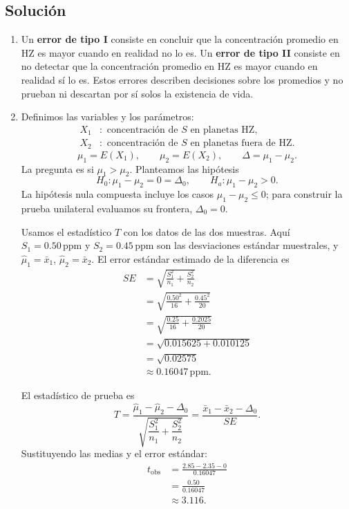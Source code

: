 \documentclass[12pt]{article}
\begin{document}
\subsection*{Solución}
\begin{enumerate}[label=(\alph*)]
    \item Un \textbf{error de tipo I} consiste en concluir que la concentración promedio en HZ es mayor cuando en realidad no lo es. Un \textbf{error de tipo II} consiste en no detectar que la concentración promedio en HZ es mayor cuando en realidad sí lo es. Estos errores describen decisiones sobre los promedios y no prueban ni descartan por sí solos la existencia de vida.

    \item Definimos las variables y los parámetros:
    \[
    \begin{aligned}
    X_1&:\text{ concentración de }S\text{ en planetas HZ},\\
    X_2&:\text{ concentración de }S\text{ en planetas fuera de HZ}.
    \end{aligned}
    \]
    $$
    \mu_1=E(X_1),\qquad \mu_2=E(X_2),\qquad
    \Delta=\mu_1-\mu_2.
    $$
    La pregunta es si $\mu_1>\mu_2$. Planteamos las hipótesis
    $$
    H_0:\mu_1-\mu_2=0=\Delta_0,
    \qquad
    H_a:\mu_1-\mu_2>0.
    $$
    La hipótesis nula compuesta incluye los casos $\mu_1-\mu_2\leq0$; para construir la prueba unilateral evaluamos su frontera, $\Delta_0=0$.

    Usamos el estadístico $T$ con los datos de las dos muestras. Aquí $S_1=0.50\,\mathrm{ppm}$ y $S_2=0.45\,\mathrm{ppm}$ son las desviaciones estándar muestrales, y $\hat{\mu}_1=\bar{x}_1$, $\hat{\mu}_2=\bar{x}_2$. El error estándar estimado de la diferencia es
    \begin{align*}
    SE
    &=\sqrt{\frac{S_1^2}{n_1}+\frac{S_2^2}{n_2}}\\
    &=\sqrt{\frac{0.50^2}{16}+\frac{0.45^2}{20}}\\
    &=\sqrt{\frac{0.25}{16}+\frac{0.2025}{20}}\\
    &=\sqrt{0.015625+0.010125}\\
    &=\sqrt{0.02575}\\
    &\approx0.16047\,\mathrm{ppm}.
    \end{align*}

    El estadístico de prueba es
    $$
    T=\frac{\hat{\mu}_1-\hat{\mu}_2-\Delta_0}
    {\sqrt{\dfrac{S_1^2}{n_1}+\dfrac{S_2^2}{n_2}}}
    =\frac{\bar{x}_1-\bar{x}_2-\Delta_0}{SE}.
    $$
    Sustituyendo las medias y el error estándar:
    \begin{align*}
    t_{\mathrm{obs}}
    &=\frac{2.85-2.35-0}{0.16047}\\
    &=\frac{0.50}{0.16047}\\
    &\approx3.116.
    \end{align*}


\end{enumerate}
\end{document}
